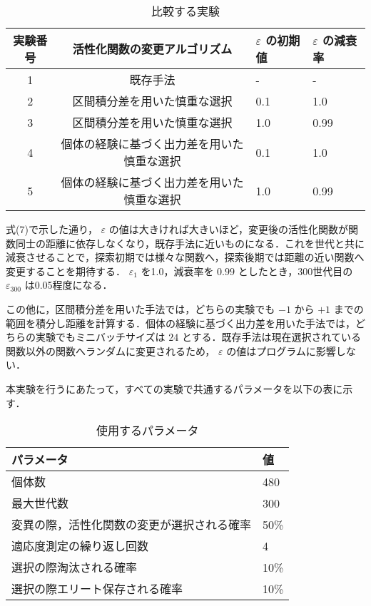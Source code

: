 \begin{table}[h]
    \caption{比較する実験}
    \centering
    \begin{tabular}{ccll}
        \hline
        実験番号  & 活性化関数の変更アルゴリズム & $ \varepsilon $ の初期値 & $ \varepsilon $ の減衰率 \\
        \hline \hline
        1 & 既存手法 & - & - \\
        2 & 区間積分差を用いた慎重な選択 & 0.1 & 1.0 \\
        3 & 区間積分差を用いた慎重な選択 & 1.0 & 0.99 \\
        4 & 個体の経験に基づく出力差を用いた慎重な選択 & 0.1 & 1.0 \\
        5 & 個体の経験に基づく出力差を用いた慎重な選択 & 1.0 & 0.99 \\
        \hline
    \end{tabular}
\end{table}

式(7)で示した通り， $ \varepsilon $ の値は大きければ大きいほど，変更後の活性化関数が関数同士の距離に依存しなくなり，既存手法に近いものになる．これを世代と共に減衰させることで，探索初期では様々な関数へ，探索後期では距離の近い関数へ変更することを期待する． $ \varepsilon_1 $ を1.0，減衰率を $ 0.99 $ としたとき，300世代目の $ \varepsilon_300 $ は0.05程度になる．

この他に，区間積分差を用いた手法では，どちらの実験でも $ -1 $ から $ +1 $ までの範囲を積分し距離を計算する．個体の経験に基づく出力差を用いた手法では，どちらの実験でもミニバッチサイズは $ 24 $ とする．既存手法は現在選択されている関数以外の関数へランダムに変更されるため， $ \varepsilon $ の値はプログラムに影響しない．

本実験を行うにあたって，すべての実験で共通するパラメータを以下の表に示す．

\begin{table}[h]
    \caption{使用するパラメータ}
    \centering
    \begin{tabular}{ll}
        \hline
        パラメータ & 値 \\
        \hline \hline
        個体数 & 480 \\
        最大世代数 & 300 \\
        変異の際，活性化関数の変更が選択される確率 & 50\% \\
        適応度測定の繰り返し回数 & 4 \\
        選択の際淘汰される確率 & 10\% \\
        選択の際エリート保存される確率 & 10\% \\
        \hline
    \end{tabular}
\end{table}

